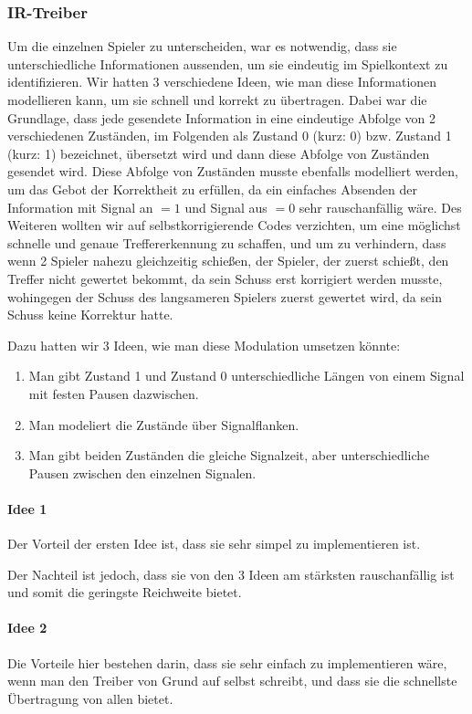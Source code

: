 \subsubsection{IR-Treiber}

Um die einzelnen Spieler zu unterscheiden, war es notwendig, dass sie unterschiedliche
Informationen aussenden, um sie eindeutig im Spielkontext zu identifizieren.
Wir hatten 3 verschiedene Ideen, wie man diese Informationen modellieren kann, um sie schnell und 
korrekt zu übertragen.
Dabei war die Grundlage, dass jede gesendete Information in eine eindeutige Abfolge von 2
verschiedenen Zuständen, im Folgenden als Zustand 0 (kurz: 0) bzw. Zustand 1 (kurz: 1)
bezeichnet, übersetzt wird und dann diese Abfolge von Zuständen gesendet wird.
Diese Abfolge von Zuständen musste ebenfalls modelliert werden, um das Gebot der Korrektheit zu
erfüllen, da ein einfaches Absenden der Information mit Signal an $= 1$ und Signal aus $= 0$ sehr
rauschanfällig wäre.
Des Weiteren wollten wir auf selbstkorrigierende Codes verzichten, um eine möglichst schnelle und
genaue Treffererkennung zu schaffen, und um zu verhindern, dass wenn 2 Spieler nahezu gleichzeitig
schießen, der Spieler, der zuerst schießt, den Treffer nicht gewertet bekommt, da sein Schuss
erst korrigiert werden musste, wohingegen der Schuss des langsameren Spielers zuerst gewertet
wird, da sein Schuss keine Korrektur hatte.

Dazu hatten wir 3 Ideen, wie man diese Modulation umsetzen könnte:
\begin{enumerate}
  \item
    Man gibt Zustand 1 und Zustand 0 unterschiedliche Längen von einem Signal mit festen Pausen
    dazwischen.
  \item
	Man modeliert die Zustände über Signalflanken.
  \item
	Man gibt beiden Zuständen die gleiche Signalzeit, aber unterschiedliche Pausen zwischen den
	einzelnen Signalen.
\end{enumerate}

\paragraph{Idee 1}
Der Vorteil der ersten Idee ist, dass sie sehr simpel zu implementieren ist.

Der Nachteil ist jedoch, dass sie von den 3 Ideen am stärksten rauschanfällig ist und somit die
geringste Reichweite bietet.

\paragraph{Idee 2}
Die Vorteile hier bestehen darin, dass sie sehr einfach zu implementieren wäre, wenn man den Treiber
von Grund auf selbst schreibt, und dass sie die schnellste Übertragung von allen bietet.

